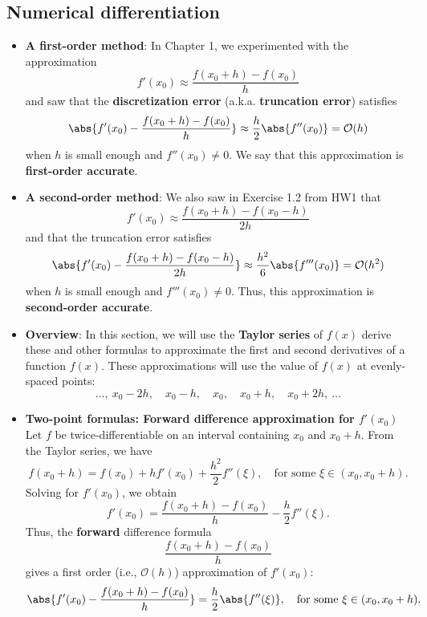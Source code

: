 \documentclass{report}
\begin{document}
     \subsection{Numerical differentiation}
     \begin{itemize}
         \item \textbf{A first-order method}:
             In Chapter 1, we experimented with the approximation
             $$ 
             f'(x_0) \approx \frac{f(x_0 + h) - f(x_0)}{h}
             $$
             and saw that the \textbf{discretization error} (a.k.a. \textbf{truncation error}) satisfies
             $$
             \abs{f'(x_0) - \frac{f(x_0+h)-f(x_0)}{h}} \approx \frac{h}{2}\abs{ f''(x_0) } = \mathcal{O}(h)
             $$
             when $h$ is small enough and $f''(x_0) \neq 0$. We say that this approximation is \textbf{first-order accurate}.
         \item \textbf{A second-order method}:
             We also saw in Exercise 1.2 from HW1 that 
             $$ f'(x_0) \approx \frac{f(x_0 + h) - f(x_0 - h)}{2h} $$
             and that the truncation error satisfies
             $$ \abs{f'(x_0) - \frac{f(x_0 + h) - f(x_0 - h)}{2h}} \approx \frac{h^2}{6}\abs{f'''(x_0)} = \mathcal{O}(h^2) $$
             when $h$ is small enough and $f'''(x_0) \neq 0$. Thus, this approximation is \textbf{second-order accurate}.
        \item \textbf{Overview}:
            In this section, we will use the \textbf{Taylor series} of $f(x)$ derive these and other formulas to approximate the first and second derivatives of a function $f(x)$.
            \bigbreak \noindent 
            These approximations will use the value of $f(x)$ at evenly-spaced points:
            $$\ldots, \ x_0 - 2h, \quad x_0 - h, \quad x_0, \quad x_0 + h, \quad x_0 + 2h, \ \ldots$$
        \item \textbf{Two-point formulas:  Forward difference approximation for $f'(x_0)$}
            Let $f$ be twice-differentiable on an interval containing $x_0$ and $x_0 + h$. From the Taylor series, we have
            $$f(x_0 + h) = f(x_0) + hf'(x_0) + \frac{h^2}{2}f''(\xi), \quad \text{for some $\xi \in (x_0,x_0+h).$}$$
            Solving for $f'(x_0)$, we obtain
            $$f'(x_0) = \frac{f(x_0+h) - f(x_0)}{h} - \frac{h}{2}f''(\xi).$$
            Thus, the \textbf{forward} difference formula 
            $$\displaystyle\frac{f(x_0+h) - f(x_0)}{h}$$
            gives a first order (i.e., $\mathcal{O}(h)$) approximation of $f'(x_0)$:
            $$\abs{f'(x_0) - \frac{f(x_0+h) - f(x_0)}{h}} = \frac{h}{2}\abs{f''(\xi)}, \quad \text{for some $\xi \in (x_0,x_0+h).$}$$

\end{itemize}
\end{document}

